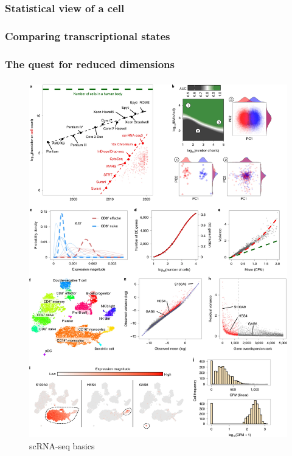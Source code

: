 \documentclass[
]{book}
\begin{document}
\hypertarget{statistical-view-of-a-cell}{%
\subsubsection{Statistical view of a cell}\label{statistical-view-of-a-cell}}

\hypertarget{comparing-transcriptional-states}{%
\subsubsection{Comparing transcriptional states}\label{comparing-transcriptional-states}}

\hypertarget{the-quest-for-reduced-dimensions}{%
\subsubsection{The quest for reduced dimensions}\label{the-quest-for-reduced-dimensions}}

\hypertarget{section}{%
\subsubsection{}\label{section}}

\begin{figure}
\centering
\includegraphics{./figs/singleCell/scRNA-seq basics.jpg}
\caption{scRNA-seq basics}
\end{figure}
\end{document}
